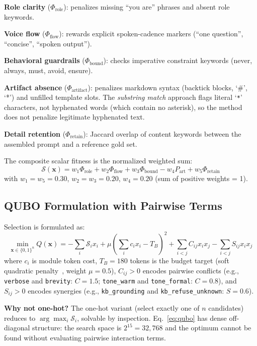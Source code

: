 \documentclass[journal]{IEEEtran}
\begin{document}
\textbf{Role clarity} ($\Phi_\text{role}$): penalizes missing ``you are''
phrases and absent role keywords.

\textbf{Voice flow} ($\Phi_\text{flow}$): rewards explicit spoken-cadence
markers (``one question'', ``concise'', ``spoken output'').

\textbf{Behavioral guardrails} ($\Phi_\text{bound}$): checks imperative
constraint keywords (never, always, must, avoid, ensure).

\textbf{Artifact absence} ($\Phi_\text{artifact}$): penalizes markdown
syntax (backtick blocks, `\#', `*') and unfilled template slots. The
\textit{substring match} approach flags literal `\texttt{*}' characters,
not hyphenated words (which contain no asterisk), so the method does not
penalize legitimate hyphenated text.

\textbf{Detail retention} ($\Phi_\text{retain}$): Jaccard overlap of
content keywords between the assembled prompt and a reference gold set.

The composite scalar fitness is the normalized weighted sum:
\begin{equation}
\mathcal{S}(\mathbf{x}) = w_1\Phi_\text{role} + w_2\Phi_\text{flow}
+ w_3\Phi_\text{bound} - w_4 P_\text{art} + w_5\Phi_\text{retain}
\label{eq:fitness}
\end{equation}
with $w_1{=}w_5{=}0.30$, $w_2{=}w_3{=}0.20$, $w_4{=}0.20$ (sum of
positive weights = 1).

\subsection{QUBO Formulation with Pairwise Terms}

Selection is formulated as:
\begin{equation}
\min_{\mathbf{x} \in \{0,1\}^n} Q(\mathbf{x}) =
-\sum_i \mathcal{S}_i x_i
+ \mu \left(\sum_i c_i x_i - T_B\right)^2
+ \sum_{i<j} C_{ij} x_i x_j
- \sum_{i<j} S_{ij} x_i x_j
\label{eq:qubo}
\end{equation}
where $c_i$ is module token cost, $T_B{=}180$ tokens is the budget target
(soft quadratic penalty~\cite{glover2019}, weight $\mu{=}0.5$), $C_{ij} > 0$ encodes
pairwise conflicts (e.g., \texttt{verbose} and \texttt{brevity}: $C{=}1.5$;
\texttt{tone\_warm} and \texttt{tone\_formal}: $C{=}0.8$), and $S_{ij} > 0$
encodes synergies (e.g., \texttt{kb\_grounding} and
\texttt{kb\_refuse\_unknown}: $S{=}0.6$).

\textbf{Why not one-hot?} The one-hot variant (select exactly one of $n$
candidates) reduces to $\arg\max_i \mathcal{S}_i$, solvable by inspection.
Eq.~\eqref{eq:qubo} has dense off-diagonal structure: the search space is
$2^{15}{=}32{,}768$ and the optimum cannot be found without evaluating
pairwise interaction terms.
\end{document}
